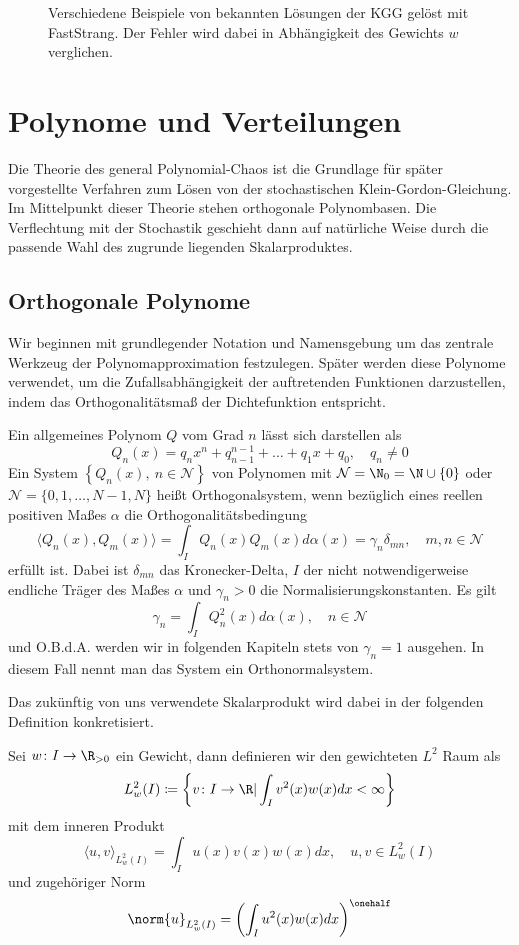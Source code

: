 \begin{mathbsp}
\begin{figure}[!htb]
\caption{Verschiedene Beispiele von bekannten Lösungen der KGG gelöst mit FastStrang. Der Fehler wird dabei in Abhängigkeit des Gewichts $w$ verglichen.}
\label{fig:splitting_dependence_on_weight}
\end{figure}
\end{mathbsp}
\section{Polynome und Verteilungen}
Die Theorie des general Polynomial-Chaos ist die Grundlage für später vorgestellte Verfahren zum Lösen von der stochastischen Klein-Gordon-Gleichung. Im Mittelpunkt dieser Theorie stehen orthogonale Polynombasen. Die Verflechtung mit der Stochastik geschieht dann auf natürliche Weise durch die passende Wahl des zugrunde liegenden Skalarproduktes.
\subsection{Orthogonale Polynome}
Wir beginnen mit grundlegender Notation und Namensgebung um das zentrale Werkzeug der Polynomapproximation festzulegen. Später werden diese Polynome verwendet, um die Zufallsabhängigkeit der auftretenden Funktionen darzustellen, indem das Orthogonalitätsmaß der Dichtefunktion entspricht.

\begin{mathdef}
Ein allgemeines Polynom $Q$ vom Grad $n$ lässt sich darstellen als
\[Q_n(x)=q_nx^n+q_{n-1}^{n-1}+\dots+q_1x+q_0,\quad q_n\ne 0\]
Ein System $\left\lbrace Q_n(x),\: n\in\mathcal{N}\right\rbrace$ von Polynomen mit $\mathcal{N}=\N_0=\N\cup\lbrace 0\rbrace$ oder $\mathcal{N}=\lbrace 0,1,\dots,N-1,N\rbrace$ heißt Orthogonalsystem, wenn bezüglich eines reellen positiven Maßes $\alpha$ die Orthogonalitätsbedingung
 \[\langle Q_n(x),Q_m(x)\rangle =\int_I Q_n(x)Q_m(x)d\alpha(x)=\gamma_n\delta_{mn},\quad m,n\in\mathcal{N}\]
 erfüllt ist. Dabei ist $\delta_{mn}$ das Kronecker-Delta, $I$ der nicht notwendigerweise endliche Träger des Maßes $\alpha$ und $\gamma_n>0$ die Normalisierungskonstanten. Es gilt 
 \[\gamma_n=\int_I Q_n^2(x)d\alpha(x),\quad n\in\mathcal{N}\] und O.B.d.A. werden wir in folgenden Kapiteln stets von $\gamma_n=1$ ausgehen. In diesem Fall nennt man das System ein Orthonormalsystem.
\end{mathdef}
Das zukünftig von uns verwendete Skalarprodukt wird dabei in der folgenden Definition konkretisiert.
\begin{mathdef}
Sei $w\colon I\to\R_{>0}$ ein Gewicht, dann definieren wir den gewichteten $L^2$ Raum als
\begin{equation*}
L_w^2(I)\coloneqq \left\lbrace v\colon I\to\R | \int_Iv^2(x)w(x)dx<\infty\right\rbrace
\end{equation*}
mit dem inneren Produkt 
\[\langle u,v\rangle_{L_w^2(I)}=\int_I u(x)v(x)w(x)dx,\quad u,v\in L_w^2(I)\]
und zugehöriger Norm
\[\norm{u}_{L_w^2(I)}=\left(\int_I u^2(x)w(x)dx\right)^{\onehalf}\]
\end{mathdef}


